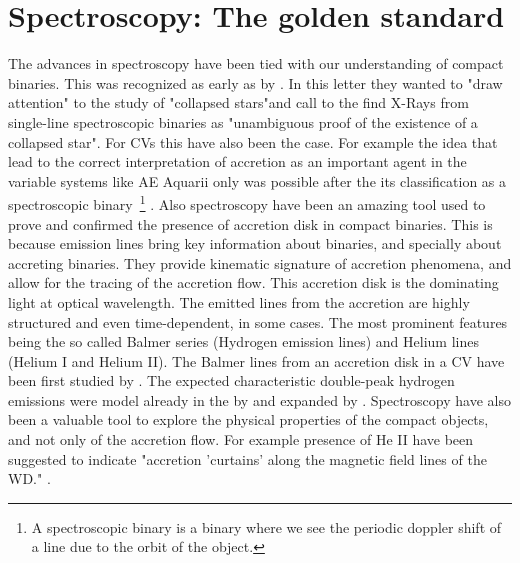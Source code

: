 \section{Spectroscopy: The golden standard}\label{sec:spec}

  
The advances in spectroscopy have been tied with our understanding of compact binaries. This was recognized as early as \citeyear{zeldovich_collapsed_1966} by \citeauthor{zeldovich_collapsed_1966}. In this letter they wanted to "draw attention" to the study of "collapsed stars"and call to the find X-Rays from single-line spectroscopic binaries as "unambiguous proof of the existence of a collapsed star". For CVs this have also been the case. For example the idea that lead to the correct interpretation of accretion as an important agent in the variable systems like AE Aquarii only was possible after the its classification as a spectroscopic binary~\footnote{A spectroscopic binary is a binary where we see the periodic doppler shift of a line due to the orbit of the object.} \citep{joy_spectroscopic_1954}. Also spectroscopy have been an amazing tool used to prove and confirmed the presence of accretion disk in compact binaries. This is because emission lines bring key information about binaries, and specially about accreting binaries. They provide kinematic signature of accretion phenomena, and allow for the tracing of the accretion flow. This accretion disk is the dominating light at optical wavelength. The emitted lines from the accretion are highly structured and even time-dependent, in some cases. The most prominent features being the so called Balmer series (Hydrogen emission lines) and Helium lines (Helium I and Helium II). The Balmer lines from an accretion disk in a CV have been first studied by \cite{williams_emission_1980}. The expected characteristic double-peak hydrogen emissions were model already in the \citeyear{smak_emission_1981} by \citeauthor{smak_emission_1981} and expanded by \cite{horne_emission_1986}. Spectroscopy have also been a valuable tool to explore the physical properties of the compact objects, and not only of the accretion flow. For example presence of He II have been suggested to indicate "accretion 'curtains' along the magnetic field lines of the WD." \citep{edmonds_cataclysmic_1999}.  


%


